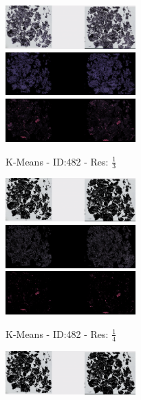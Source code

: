 \documentclass[a4paper,10pt,oneside]{article}
\begin{document}
\begin{figure}[hbtp]
  \begin{subfigure}[b]{5cm}
    \includegraphics[width=5cm]{visualization/results/kmeans/res_reduce_3/Region_0_PO14-00482B3_1_2_201404171123.png}
    \includegraphics[width=5cm]{visualization/results/kmeans/res_reduce_3/Region_1_PO14-00482B3_1_2_201404171123.png}
    \includegraphics[width=5cm]{visualization/results/kmeans/res_reduce_3/Region_2_PO14-00482B3_1_2_201404171123.png}
    \caption{K-Means - ID:482 - Res: $\frac{1}{3}$}
  \end{subfigure}
  \begin{subfigure}[b]{5cm}
    \includegraphics[width=5cm]{visualization/results/kmeans/res_reduce_4/Region_0_PO14-00482B3_1_2_201404171123.png}
    \includegraphics[width=5cm]{visualization/results/kmeans/res_reduce_4/Region_1_PO14-00482B3_1_2_201404171123.png}
    \includegraphics[width=5cm]{visualization/results/kmeans/res_reduce_4/Region_2_PO14-00482B3_1_2_201404171123.png}
    \caption{K-Means - ID:482 - Res: $\frac{1}{4}$}
  \end{subfigure}
  \begin{subfigure}[b]{5cm}
    \includegraphics[width=5cm]{visualization/results/kmeans/res_reduce_5/Region_0_PO14-00482B3_1_2_201404171123.png}

\end{subfigure}
\end{figure}
\end{document}
